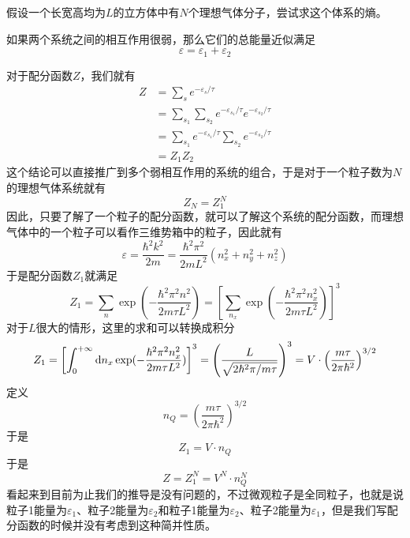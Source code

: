 \begin{example}
       假设一个长宽高均为$L$的立方体中有$N$个理想气体分子，尝试求这个体系的熵。
\end{example}
\begin{solution}
       如果两个系统之间的相互作用很弱，那么它们的总能量近似满足\begin{equation}
              \varepsilon=\varepsilon_1+\varepsilon_2
       \end{equation}
       
       对于配分函数$Z$，我们就有\begin{equation}
       \begin{aligned}
              Z&=\sum_s e^{-\varepsilon_s/\tau}\\
              &=\sum_{s_1}\sum_{s_2}e^{-\varepsilon_{s_1}/\tau}e^{-\varepsilon_{s_2}/\tau}\\
              &=\sum_{s_1}e^{-\varepsilon_{s_1}/\tau}\sum_{s_2}e^{-\varepsilon_{s_2}/\tau}\\
              &=Z_1Z_2
       \end{aligned}
       \end{equation}
       这个结论可以直接推广到多个弱相互作用的系统的组合，于是对于一个粒子数为$N$的理想气体系统就有
       \begin{equation}
              Z_N=Z_1^N
       \end{equation}
       因此，只要了解了一个粒子的配分函数，就可以了解这个系统的配分函数，而理想气体中的一个粒子可以看作三维势箱中的粒子，因此就有\begin{equation}
              \varepsilon=\frac{\hbar^2 k^2}{2m}=\frac{\hbar^2 \pi^2}{2mL^2}(n_x^2+n_y^2+n_z^2)
       \end{equation}
       于是配分函数$Z_1$就满足\begin{equation}
              Z_1=\sum_n \exp({-\frac{\hbar^2 \pi^2 n^2}{2m\tau L^2}})=\left[\sum_{n_x} \exp(-\frac{\hbar^2 \pi^2 n_x^2}{2m\tau L^2})\right]^3
       \end{equation}
       对于$L$很大的情形，这里的求和可以转换成积分
       \begin{equation}
              Z_1=\left[\int_{0}^{+\infty} \mathrm{d} n_x \exp(-\frac{\hbar^2 \pi^2 n_x^2}{2m\tau L^2}) \right]^3=\left(\frac{L}{\sqrt{2\hbar^2 \pi/ m\tau}}\right)^3=V\cdot \left(\frac{m\tau}{2\pi\hbar^2}\right)^{3/2}
       \end{equation}
       定义\begin{equation}
              n_Q=\left(\frac{m\tau}{2\pi\hbar^2}\right)^{3/2}
       \end{equation}
       于是\begin{equation}
              Z_1=V\cdot n_Q
       \end{equation}
       于是\begin{equation}
              Z=Z_1^N =V^N \cdot n_Q^N
       \end{equation}
       看起来到目前为止我们的推导是没有问题的，不过微观粒子是全同粒子，也就是说粒子1能量为$\varepsilon_1$、粒子2能量为$\varepsilon_2$和粒子1能量为$\varepsilon_2$、粒子2能量为$\varepsilon_1$，但是我们写配分函数的时候并没有考虑到这种简并性质。
       

\end{solution}
